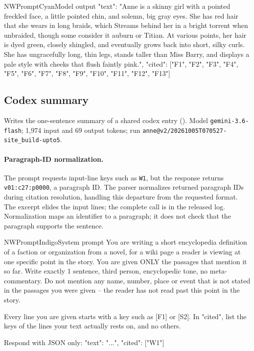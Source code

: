 \begin{nwprompt}{NWPromptCyan}{Model output}
{"text": "Anne is a skinny girl with a pointed freckled face, a little pointed chin, and solemn, big gray eyes. She has red hair that she wears in long braids, which Streams behind her in a bright torrent when unbraided, though some consider it auburn or Titian. At various points, her hair is dyed green, closely shingled, and eventually grows back into short, silky curls. She has ungracefully long, thin legs, stands taller than Miss Barry, and displays a pale style with cheeks that flush faintly pink.", "cited": ["F1", "F2", "F3", "F4", "F5", "F6", "F7", "F8", "F9", "F10", "F11", "F12", "F13"]}
\end{nwprompt}

\subsection*{Codex summary}
Writes the one-sentence summary of a shared codex entry (\sys). Model \texttt{gemini-3.6-flash}; 1,974 input and 69 output tokens; run \nolinkurl{anne@v2/20261005T070527-site_build-upto5}.

\paragraph{Paragraph-ID normalization.} The prompt requests input-line keys such as
\texttt{W1}, but the response returns \texttt{v01:c27:p0000}, a paragraph ID. The parser
normalizes returned paragraph IDs during citation resolution, handling this departure from
the requested format. The excerpt elides the input lines; the complete call is in the
released log. Normalization maps an identifier to a paragraph; it does not check that the
paragraph supports the sentence.

\begin{nwprompt}{NWPromptIndigo}{System prompt}
You are writing a short encyclopedia definition of a faction or organization from a novel, for a wiki page a reader is viewing at one specific point in the story. You are given ONLY the passages that mention it so far. Write exactly 1 sentence, third person, encyclopedic tone, no meta-commentary. Do not mention any name, number, place or event that is not stated in the passages you were given -- the reader has not read past this point in the story.

Every line you are given starts with a key such as [F1] or [S2]. In "cited", list the keys of the lines your text actually rests on, and no others.

Respond with JSON only: {"text": "...", "cited": ["W1"]}
\end{nwprompt}

